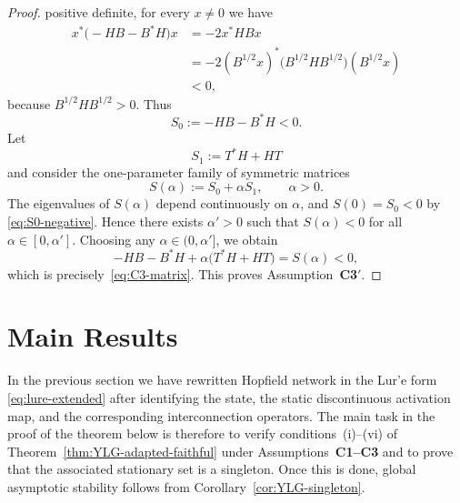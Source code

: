 \documentclass[journal]{IEEEtran}
\theoremstyle{myplain}
\begin{document}
\begin{proof}
positive definite, for every $x\neq 0$ we have
\begin{align*}
  x^{*}\bigl(-HB - B^{*}H\bigr) x
    &= -2x^{*}HBx \\
    &= -2(B^{1/2}x)^{*}\bigl(B^{1/2}HB^{1/2}\bigr)(B^{1/2}x) \\
    &< 0,
\end{align*}
because $B^{1/2}HB^{1/2}> 0$.  Thus
\begin{equation}\label{eq:S0-negative}
  S_0 := -HB - B^{*}H < 0 .
\end{equation}
Let
\[
  S_1 := T^{*}H + HT
\]
and consider the one-parameter family of symmetric matrices
\[
  S(\alpha) := S_0 + \alpha S_1,
  \qquad \alpha > 0.
\]
The eigenvalues of $S(\alpha)$ depend continuously on $\alpha$, and
$S(0)=S_0< 0$ by \eqref{eq:S0-negative}.  Hence there exists
$\alpha'>0$ such that $S(\alpha)< 0$ for all
$\alpha\in[0,\alpha']$.  Choosing any
$\alpha\in(0,\alpha']$, we obtain
\[
  -HB - B^{*}H + \alpha\bigl(T^{*}H + HT\bigr)
  = S(\alpha) < 0 ,
\]
which is precisely~\eqref{eq:C3-matrix}.  This proves
Assumption~\textbf{C3$'$}.
\end{proof}
\section{Main Results}\label{sec:main}

In the previous section we have rewritten  Hopfield network
in the Lur'e form \eqref{eq:lure-extended} after identifying the state,
the static discontinuous activation map, and the corresponding interconnection
operators. The main task in the proof of the theorem below is therefore to
verify conditions~(i)--(vi) of Theorem~\ref{thm:YLG-adapted-faithful} under
Assumptions~\textbf{C1--C3} and to prove that the associated stationary set is a
singleton. Once this is done, global asymptotic stability follows from
Corollary~\ref{cor:YLG-singleton}.
\end{document}
